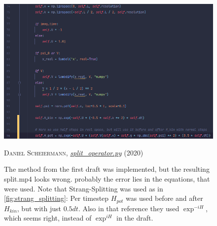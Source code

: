 \begin{figure}[H]
    \centering
    \includegraphics[width=1.0\textwidth]{IMAGE/find_the_error.png}\\
    \caption{
      The method from the first draft was implemented, but the resulting split.mp4 looks wrong.
      probably the error lies in the equations, that were used. Note that Strang-Splitting was used as in       \ref{fig:strang_splitting}: Per timestep $H_{pot}$ was used before and after $H_{kin}$, but with just $0.5dt$.
      Also in that reference they used $\exp^{-iH}$, which seems right, instead of $\exp^{iH}$ in the draft.
    }
    \textsc{Daniel Scheiermann},
    \emph{\url{split_operator.py}} (2020)
    \label{fig:find_the_error}
\end{figure}


